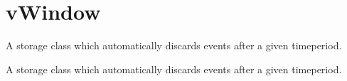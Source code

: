 \hypertarget{group__vWindow}{}\section{v\+Window}
\label{group__vWindow}


A storage class which automatically discards events after a given timeperiod.  


A storage class which automatically discards events after a given timeperiod. 

